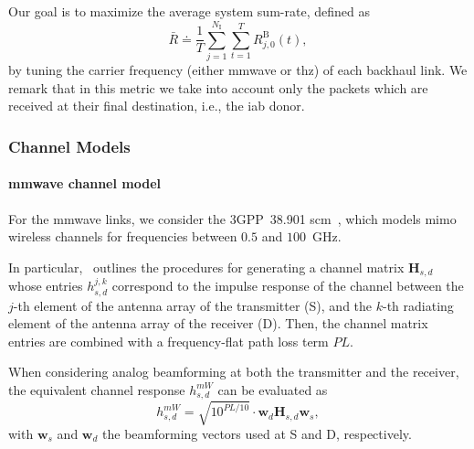 Our goal is to maximize the average system sum-rate, defined as
\begin{equation}
 \bar{R} \doteq \frac{1}{T} \sum_{j = 1}^{N_{\mathrm{I}}} \sum_{t = 1}^{T} R_{j, 0}^{\mathrm{B}} (t),
\end{equation}
%
by tuning the carrier frequency (either \gls{mmwave} or \gls{thz}) of each backhaul link. We remark that in this metric we take into account only the packets which are received at their final destination, i.e., the \gls{iab} donor.

\subsubsection{Channel Models}
\label{sub:channelmodel}
\paragraph{\gls{mmwave} channel model}

For the \gls{mmwave} links, we consider the 3GPP~38.901 \gls{scm}~\cite{3gpp.38.901}, which models \gls{mimo} wireless channels for frequencies between $0.5$ and $100$~GHz. %

In particular,~\cite{3gpp.38.901} outlines the procedures for generating a channel matrix $\bm{H}_{s, d}$ whose entries $h_{s, d}^{j, k}$ correspond to the impulse response of the channel between the $j$-th element of the antenna array of the transmitter (S), and the $k$-th radiating element of the antenna array of the receiver (D). %
Then, the channel matrix entries are combined with a frequency-flat path loss term $PL$. 

When considering analog beamforming at both the transmitter and the receiver, the equivalent channel response $h_{s, d}^{mW}$ can be evaluated as
\begin{equation}
\label{eq:sinr}
    h_{s, d}^{mW} = \sqrt{10^{PL/10}} \cdot \bm{w}_{d} \bm{H}_{s, d} \bm{w}_{s},
\end{equation}
%
with $\bm{w}_{s}$ and $\bm{w}_{d}$ the beamforming vectors used at S and D, respectively.

